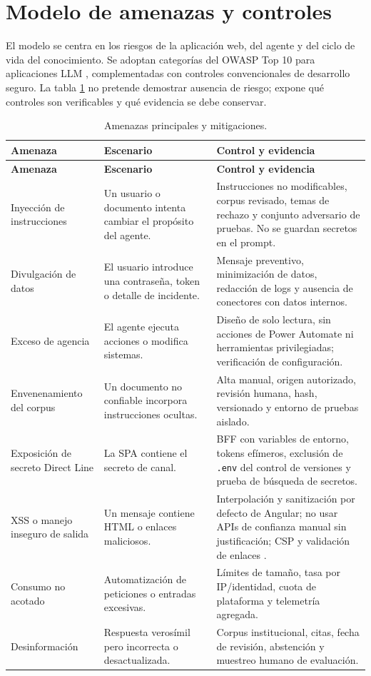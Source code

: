 \documentclass[12pt,twoside,titlepage]{book}
\begin{document}
\section{Modelo de amenazas y controles}

El modelo se centra en los riesgos de la aplicaci\'on web, del agente y del ciclo de vida del conocimiento. Se adoptan categor\'ias del OWASP Top 10 para aplicaciones LLM \cite{owaspLlm2026}, complementadas con controles convencionales de desarrollo seguro. La tabla \ref{tab:amenazas} no pretende demostrar ausencia de riesgo; expone qu\'e controles son verificables y qu\'e evidencia se debe conservar.

\begin{longtable}{p{}p{}p{}}
\caption{Amenazas principales y mitigaciones.}\label{tab:amenazas}\\
\toprule
\textbf{Amenaza} & \textbf{Escenario} & \textbf{Control y evidencia}\\
\midrule
\endfirsthead
\toprule
\textbf{Amenaza} & \textbf{Escenario} & \textbf{Control y evidencia}\\
\midrule
\endhead
Inyecci\'on de instrucciones & Un usuario o documento intenta cambiar el prop\'osito del agente. & Instrucciones no modificables, corpus revisado, temas de rechazo y conjunto adversario de pruebas. No se guardan secretos en el prompt.\\
Divulgaci\'on de datos & El usuario introduce una contrase\~na, token o detalle de incidente. & Mensaje preventivo, minimizaci\'on de datos, redacci\'on de logs y ausencia de conectores con datos internos.\\
Exceso de agencia & El agente ejecuta acciones o modifica sistemas. & Dise\~no de solo lectura, sin acciones de Power Automate ni herramientas privilegiadas; verificaci\'on de configuraci\'on.\\
Envenenamiento del corpus & Un documento no confiable incorpora instrucciones ocultas. & Alta manual, origen autorizado, revisi\'on humana, hash, versionado y entorno de pruebas aislado.\\
Exposici\'on de secreto Direct Line & La SPA contiene el secreto de canal. & BFF con variables de entorno, tokens ef\'imeros, exclusi\'on de \texttt{.env} del control de versiones y prueba de b\'usqueda de secretos.\\
XSS o manejo inseguro de salida & Un mensaje contiene HTML o enlaces maliciosos. & Interpolaci\'on y sanitizaci\'on por defecto de Angular; no usar APIs de confianza manual sin justificaci\'on; CSP y validaci\'on de enlaces \cite{angularSecurity}.\\
Consumo no acotado & Automatizaci\'on de peticiones o entradas excesivas. & L\'imites de tama\~no, tasa por IP/identidad, cuota de plataforma y telemetr\'ia agregada.\\
Desinformaci\'on & Respuesta veros\'imil pero incorrecta o desactualizada. & Corpus institucional, citas, fecha de revisi\'on, abstenci\'on y muestreo humano de evaluaci\'on.\\
\bottomrule
\end{longtable}
\end{document}

